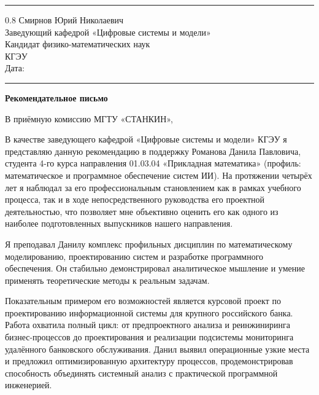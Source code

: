 \documentclass[a4paper,12pt]{article}
\begin{document}
\vspace{4pt}
\noindent\rule{\textwidth}{0.8pt}

\begin{flushright}
  \begin{spacing}{0.8}
    Смирнов Юрий Николаевич\\
    Заведующий кафедрой «Цифровые системы и модели»\\
    Кандидат физико-математических наук\\
    КГЭУ\\[6pt]
    Дата: \rule{4cm}{0.4pt}
  \end{spacing}
\end{flushright}

\begin{center}
  {\Large\bfseries Рекомендательное письмо}
\end{center}

В приёмную комиссию МГТУ «СТАНКИН»,

В качестве заведующего кафедрой «Цифровые системы и модели» КГЭУ я представляю данную рекомендацию в поддержку Романова Данила Павловича, студента 4-го курса направления 01.03.04 «Прикладная математика» (профиль: ма\-те\-ма\-ти\-че\-ское и про\-грамм\-ное обес\-пе\-че\-ние систем ИИ). На протяжении четырёх лет я наблюдал за его профессиональным становлением как в рамках учебного процесса, так и в ходе непосредственного руководства его проектной деятельностью, что позволяет мне объективно оценить его как одного из наиболее подготовленных выпускников нашего направления.

Я преподавал Данилу комплекс профильных дисциплин по математическому моделированию, проектированию систем и разработке программного обеспечения. Он стабильно демонстрировал аналитическое мышление и умение применять теоретические методы к реальным задачам.

Показательным примером его возможностей является курсовой проект по проектированию информационной системы для крупного российского банка. Работа охватила полный цикл: от предпроектного анализа и реинжиниринга бизнес-процессов до проектирования и реализации подсистемы мониторинга удалённого банковского обслуживания. Данил выявил операционные узкие места и предложил оптимизированную архитектуру процессов, продемонстрировав способность объединять системный анализ с практической программной инженерией.
\end{document}
